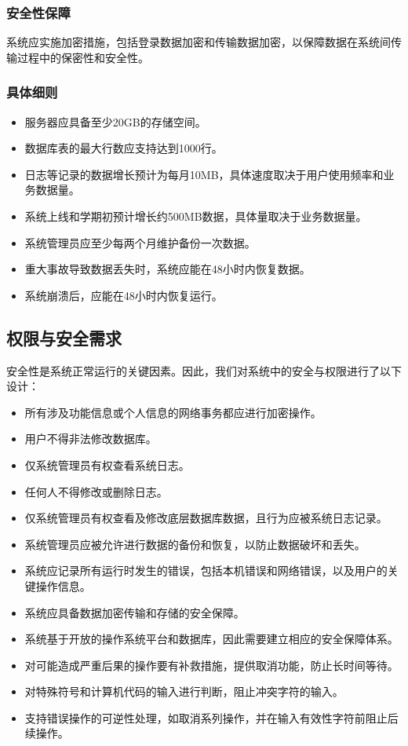 \subsubsection{安全性保障}
系统应实施加密措施，包括登录数据加密和传输数据加密，以保障数据在系统间传输过程中的保密性和安全性。

\subsubsection{具体细则}
\begin{itemize}
	\item 服务器应具备至少20GB的存储空间。
	\item 数据库表的最大行数应支持达到1000行。
	\item 日志等记录的数据增长预计为每月10MB，具体速度取决于用户使用频率和业务数据量。
	\item 系统上线和学期初预计增长约500MB数据，具体量取决于业务数据量。
	\item 系统管理员应至少每两个月维护备份一次数据。
	\item 重大事故导致数据丢失时，系统应能在48小时内恢复数据。
	\item 系统崩溃后，应能在48小时内恢复运行。
\end{itemize}

\subsection{权限与安全需求}
安全性是系统正常运行的关键因素。因此，我们对系统中的安全与权限进行了以下设计：
\begin{itemize}
	\item 所有涉及功能信息或个人信息的网络事务都应进行加密操作。
	\item 用户不得非法修改数据库。
	\item 仅系统管理员有权查看系统日志。
	\item 任何人不得修改或删除日志。
	\item 仅系统管理员有权查看及修改底层数据库数据，且行为应被系统日志记录。
	\item 系统管理员应被允许进行数据的备份和恢复，以防止数据破坏和丢失。
	\item 系统应记录所有运行时发生的错误，包括本机错误和网络错误，以及用户的关键操作信息。
	\item 系统应具备数据加密传输和存储的安全保障。
	\item 系统基于开放的操作系统平台和数据库，因此需要建立相应的安全保障体系。
	\item 对可能造成严重后果的操作要有补救措施，提供取消功能，防止长时间等待。
	\item 对特殊符号和计算机代码的输入进行判断，阻止冲突字符的输入。
	\item 支持错误操作的可逆性处理，如取消系列操作，并在输入有效性字符前阻止后续操作。
\end{itemize}

